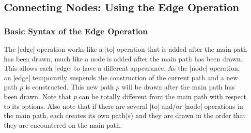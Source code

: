\subsection{Connecting Nodes: Using the Edge Operation}

\label{section-nodes-edges}

\subsubsection{Basic Syntax of the Edge Operation}

The |edge| operation works like a |to| operation that is added after
the main path has been drawn, much like a node is added after the main
path has been drawn. This allows each |edge| to have a
different appearance. As the |node| operation, an |edge| temporarily
suspends the construction of the current path and a new path $p$ is
constructed. This new path $p$ will be drawn after the main path has
been drawn. Note that $p$ can be totally different from the main
path with respect to its options. Also note that if there are
several |to| and/or |node| operations in the main path, each
creates its own path(s) and they are drawn in the order that they
are encountered on the main path.

